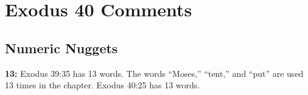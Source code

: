 \section{Exodus 40 Comments}

\subsection{Numeric Nuggets}
\textbf{13: } Exodus 39:35 has 13 words. The words ``Moses,'' ``tent,'' and ``put'' are used 13 times in the chapter. Exodus 40:25 has 13 words.

